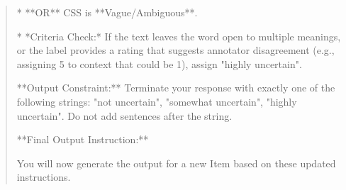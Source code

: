 \begin{quote}
    *   **OR** CSS is **Vague/Ambiguous**.

    *   *Criteria Check:* If the text leaves the word open to multiple meanings, or the label provides a rating that suggests annotator disagreement (e.g., assigning 5 to context that could be 1), assign "highly uncertain".



**Output Constraint:** Terminate your response with exactly one of the following strings: "not uncertain", "somewhat uncertain", "highly uncertain". Do not add sentences after the string.



**Final Output Instruction:**

You will now generate the output for a new Item based on these updated instructions.
\end{quote}
